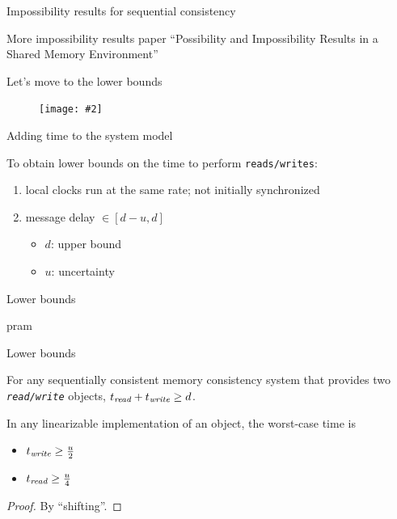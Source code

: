 \documentclass{beamer}
\makeatletter
\newcommand{\citeinbeamer}[3]{{\scriptsize{\textcolor{blue}{[#1@#2'#3]}}}}
\newcommand{\fignocaption}[2]
{
  \begin{figure}[htp]
    \centering
      \texttt{[image: \#2]}
  \end{figure}
}
\makeatother
\begin{document}
\begin{frame}{Impossibility results for sequential consistency}
  \begin{theorem}
  \end{theorem}
\end{frame}
\begin{frame}{More impossibility results}
  paper ``Possibility and Impossibility Results in a Shared Memory Environment''
\end{frame}
\begin{frame}[label = lowerbounds-backup]{Let's move to the lower bounds
\hyperlink{impossibility-lowerbounds-main}{}}
  \fignocaption{width = 0.30\textwidth}{fig/omega-lower-bounds.pdf}
\end{frame}
\begin{frame}{Adding time to the system model}
  \begin{block}{To obtain lower bounds on the time to perform
  \texttt{reads/writes}:}
	\begin{enumerate}
	  \item local clocks run at the same rate; not initially synchronized
	  \item message delay $\in [d-u, d]$
	    \begin{itemize}
	      \item $d$: upper bound
	      \item $u$: uncertainty
	    \end{itemize}
	\end{enumerate}
  \end{block}
\end{frame}
\begin{frame}{Lower bounds}
  \begin{theorem}
    pram
  \end{theorem}
\end{frame}
\begin{frame}{Lower bounds}
  \begin{theorem}[\citeinbeamer{Attiya}{TOCS}{94}]
    For any sequentially consistent memory consistency system that provides two
    \texttt{\it read/write} objects, $t_{\texttt{\it read}} + t_{\texttt{\it
    write}} \geq d$.
  \end{theorem}

  \begin{theorem}[\citeinbeamer{Attiya}{TOCS}{94}]
    In any linearizable implementation of an object, the worst-case time is
    \begin{itemize}
      \item $t_{\texttt{\it write}} \geq \frac{u}{2}$
      \item $t_{\texttt{\it read}} \geq \frac{u}{4}$
    \end{itemize}
  \end{theorem}

  \begin{proof}
    By ``shifting''.
  \end{proof}
\end{frame}
\end{document}
